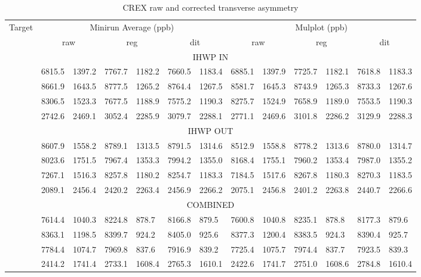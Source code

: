 \begin{table}[!h]
    \scriptsize
    \begin{tabular}{c | r@{ $\pm$ }l r@{ $\pm$ }l r@{ $\pm$ }l | r@{ $\pm$ }l r@{ $\pm$ }l r@{ $\pm$ }l}
	\hline
	\multirow{2}{*}{Target}	& \multicolumn{6}{c|}{Minirun Average (ppb)} & \multicolumn{6}{c}{Mulplot (ppb)}	\\
	\cline{2-13}
	    & \multicolumn{2}{c}{raw}   & \multicolumn{2}{c}{reg}	& \multicolumn{2}{c|}{dit}   & \multicolumn{2}{c}{raw}	& \multicolumn{2}{c}{reg}   & \multicolumn{2}{c}{dit}	\\
	\hline
	\multicolumn{13}{c}{IHWP IN}   \\
	\hline
	\Carbon	& 6815.5    & 1397.2	& 7767.7    & 1182.2	& 7660.5    & 1183.4	& 6885.1    & 1397.9	& 7725.7    & 1182.1	& 7618.8 & 1183.3	\\ 
	\ca     & 8661.9    & 1643.5	& 8777.5    & 1265.2	& 8764.4    & 1267.5	& 8581.7    & 1645.3	& 8743.9    & 1265.3	& 8733.3 & 1267.6	\\ 
	\Ca     & 8306.5    & 1523.3   	& 7677.5    & 1188.9	& 7575.2    & 1190.3	& 8275.7    & 1524.9	& 7658.9    & 1189.0	& 7553.5 & 1190.3	\\ 
	\Pb	& 2742.6    & 2469.1   	& 3052.4    & 2285.9	& 3079.7    & 2288.1	& 2771.1    & 2469.6	& 3101.8    & 2286.2	& 3129.9 & 2288.3	\\ 
	\hline
	\multicolumn{13}{c}{IHWP OUT}   \\
	\hline
	\Carbon	& 8607.9	& 1558.2    & 8789.1	& 1313.5    & 8791.5	& 1314.6    & 8512.9    & 1558.8	& 8778.2    & 1313.6	& 8780.0    & 1314.7	\\      
	\ca      & 8023.6	& 1751.5    & 7967.4	& 1353.3    & 7994.2	& 1355.0    & 8168.4    & 1755.1	& 7960.2    & 1353.4	& 7987.0    & 1355.2	\\      
	\Ca      & 7267.1	& 1516.3    & 8257.8	& 1180.2    & 8254.7	& 1183.3    & 7184.5    & 1517.6	& 8267.8    & 1180.3	& 8270.3    & 1183.5	\\      
	\Pb	& 2089.1	& 2456.4    & 2420.2	& 2263.4    & 2456.9	& 2266.2    & 2075.1    & 2456.8	& 2401.2    & 2263.8	& 2440.7    & 2266.6	\\      
	\hline
	\multicolumn{13}{c}{COMBINED}   \\
	\hline
	\Carbon	& 7614.4	& 1040.3    & 8224.8	& 878.7     & 8166.8	& 879.5	    & 7600.8    & 1040.8	& 8235.1    & 878.8 	& 8177.3    & 879.6	\\      
	\Ca      & 8363.1	& 1198.5    & 8399.7	& 924.2     & 8405.0	& 925.6	    & 8377.3    & 1200.4	& 8383.5    & 924.3 	& 8390.4    & 925.7 	\\        
	\Ca  	& 7784.4	& 1074.7    & 7969.8	& 837.6     & 7916.9	& 839.2	    & 7725.4    & 1075.7	& 7974.4    & 837.7 	& 7923.5    & 839.3 	\\        
	\Pb      & 2414.2	& 1741.4    & 2733.1	& 1608.4    & 2765.3	& 1610.1    & 2422.6    & 1741.7	& 2751.0    & 1608.6	& 2784.8    & 1610.4	\\        
	\hline
    \end{tabular}
    \caption{CREX raw and corrected transverse asymmetry}
\end{table}

